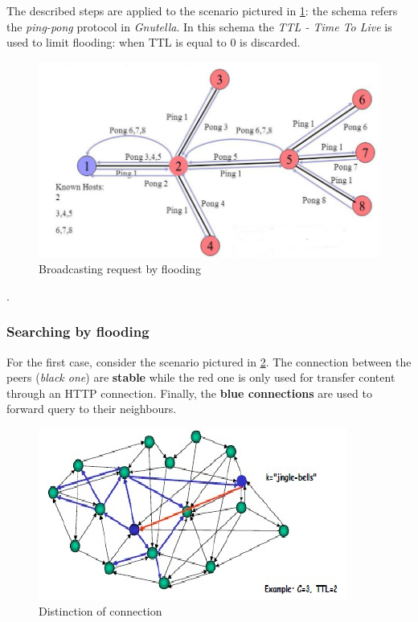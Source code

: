 \documentclass[10pt,a4paper]{report}
\begin{document}
The described steps are applied to the scenario pictured in \ref{flooding-scenario}: the schema refers the \textit{ping-pong} protocol in \textit{Gnutella}. In this schema the \textit{TTL - Time To Live} is used to limit flooding: when TTL is equal to 0 is discarded.
\begin{figure}[h!]
	\centering
	\includegraphics[scale=0.50]{images/Pasted image 20230225085817.png}
	\caption{Broadcasting request by flooding}
	\label{flooding-scenario}
\end{figure}


.
\subsubsection{Searching by flooding}\label{sec:searching-by-flooding}
For the first case, consider the scenario pictured in \ref{peer-conn}. The connection between the peers (\textit{black one}) are \textbf{stable} while the red one is only used for transfer content through an HTTP connection. Finally, the \textbf{blue connections} are used to forward query to their neighbours.
\begin{figure}[h]
	\centering
	\includegraphics[scale=0.60]{images/Pasted image 20230301111905.png}
	\caption{Distinction of connection}
	\label{peer-conn}
\end{figure}
\end{document}
